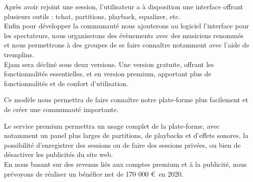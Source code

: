 \documentclass[a4,12pt]{article}
\begin{document}
Après avoir rejoint une session, l'utilisateur a à disposition une interface offrant plusieurs outils : tchat, partitions, playback, equalizer, etc.\\


Enfin pour développer la communauté nous ajouterons au logiciel
l’interface pour les spectateurs, nous organiserons des évènements avec des
musiciens renommés et nous permettrons à des groupes de se faire connaître notamment
avec l’aide de tremplins.
\\

Ejam sera décliné sous deux versions. Une version gratuite, offrant les fonctionnalités essentielles, et en version premium, apportant plus de fonctionnalités et de confort d'utilisation.

Ce modèle nous permettra de faire connaître notre plate-forme plus facilement et de créer une communauté importante.

Le service premium permettra un usage complet de la plate-forme, avec notamment un panel plus larges de partitions, de playbacks et d'effets sonores, la possibilité d'enregistrer des sessions ou de faire des sessions privées, ou bien de désactiver les publicités du site web.\\

En nous basant sur des revenus liés aux comptes premium et à la publicité, nous prévoyons de réaliser un bénéfice net de 170 000 \euro\ en 2020.
\end{document}
